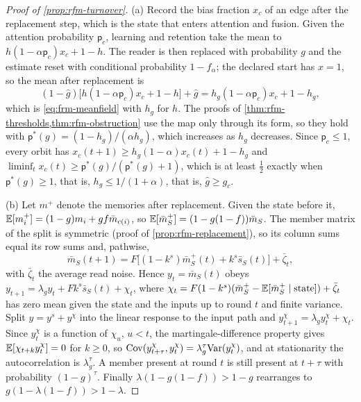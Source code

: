 \begin{proof}[Proof of \cref{prop:rfm-turnover}]
(a) Record the bias fraction $x_c$ of an edge after the replacement step, which is the state that enters attention and fusion. Given the attention probability $\mathsf p_c$, learning and retention take the mean to $h(1-\alpha\mathsf p_c)x_c+1-h$. The reader is then replaced with probability $g$ and the estimate reset with conditional probability $1-f_\alpha$; the declared start has $x=1$, so the mean after replacement is
\begin{equation*}
(1-\hat g)\bigl[h(1-\alpha\mathsf p_c)x_c+1-h\bigr]+\hat g=h_g(1-\alpha\mathsf p_c)x_c+1-h_g,
\end{equation*}
which is \eqref{eq:frm-meanfield} with $h_g$ for $h$. The proofs of \cref{thm:rfm-thresholds,thm:rfm-obstruction} use the map only through its form, so they hold with $\mathsf p^\ast(g)=(1-h_g)/(\alpha h_g)$, which increases as $h_g$ decreases. Since $\mathsf p_c\le1$, every orbit has $x_c(t+1)\ge h_g(1-\alpha)x_c(t)+1-h_g$ and $\liminf_tx_c(t)\ge\mathsf p^\ast(g)/(\mathsf p^\ast(g)+1)$, which is at least $\frac12$ exactly when $\mathsf p^\ast(g)\ge1$, that is, $h_g\le1/(1+\alpha)$, that is, $\hat g\ge g_c$.

(b) Let $m^+$ denote the memories after replacement. Given the state before it, $\mathbb{E}[m_i^+]=(1-g)m_i+gf\bar m_{c(i)}$, so $\mathbb{E}[\bar m_S^+]=(1-g(1-f))\bar m_S$. The member matrix of the split is symmetric (proof of \cref{prop:rfm-replacement}), so its column sums equal its row sums and, pathwise,
\begin{equation*}
\bar m_S(t+1)=F\bigl[(1-k^s)\bar m_S^+(t)+k^s\bar s_S(t)\bigr]+\bar\zeta_t,
\end{equation*}
with $\bar\zeta_t$ the average read noise. Hence $y_t=\bar m_S(t)$ obeys $y_{t+1}=\lambda_gy_t+Fk^s\bar s_S(t)+\chi_t$, where $\chi_t=F(1-k^s)(\bar m_S^+-\mathbb{E}[\bar m_S^+\mid\text{state}])+\bar\zeta_t$ has zero mean given the state and the inputs up to round $t$ and finite variance. Split $y=y^{s}+y^{\chi}$ into the linear response to the input path and $y^\chi_{t+1}=\lambda_gy^\chi_t+\chi_t$. Since $y^\chi_t$ is a function of $\chi_u$, $u<t$, the martingale-difference property gives $\mathbb{E}[\chi_{t+k}y^\chi_t]=0$ for $k\ge0$, so $\operatorname{Cov}(y^\chi_{t+\tau},y^\chi_t)=\lambda_g^\tau\mathrm{Var}(y^\chi_t)$, and at stationarity the autocorrelation is $\lambda_g^\tau$. A member present at round $t$ is still present at $t+\tau$ with probability $(1-g)^\tau$. Finally $\lambda(1-g(1-f))>1-g$ rearranges to $g(1-\lambda(1-f))>1-\lambda$.
\end{proof}

